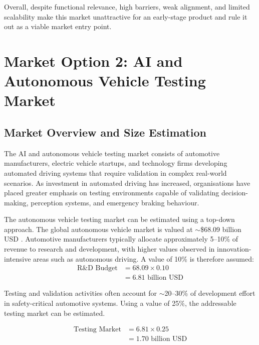 \documentclass[11pt, a4paper]{report}
\numberwithin{equation}{section}
\begin{document}
\begin{refsection}
Overall, despite functional relevance, high barriers, weak alignment, and limited scalability make this market unattractive for an early-stage product and rule it out as a viable market entry point.

\section{Market Option 2: AI and Autonomous Vehicle Testing Market}

\subsection{Market Overview and Size Estimation}

The AI and autonomous vehicle testing market consists of automotive manufacturers, electric vehicle startups, and technology firms developing automated driving systems that require validation in complex real-world scenarios. As investment in automated driving has increased, organisations have placed greater emphasis on testing environments capable of validating decision-making, perception systems, and emergency braking behaviour.

The autonomous vehicle testing market can be estimated using a top-down approach. The global autonomous vehicle market is valued at $\sim$\$68.09 billion USD {\cite{grandview_autonomous_market}}. Automotive manufacturers typically allocate approximately 5--10\% of revenue to research and development, with higher values observed in innovation-intensive areas such as autonomous driving. A value of 10\% is therefore assumed:
\vspace{-9pt}
\begin{equation}
\begin{aligned}
\text{R\&D Budget} &= 68.09 \times 0.10 \\
&= 6.81 \text{ billion USD}
\end{aligned}
\end{equation}
\vspace{-2pt}

Testing and validation activities often account for $\sim$20--30\% {\cite{mckinsey_testing_validation}} of development effort in safety-critical automotive systems. Using a value of 25\%, the addressable testing market can be estimated.

\vspace{-15pt}
\begin{equation}
\begin{aligned}
\text{Testing Market} &= 6.81 \times 0.25 \\
&= 1.70 \text{ billion USD}
\end{aligned}
\end{equation}
\vspace{-5pt}


\end{refsection}
\end{document}
